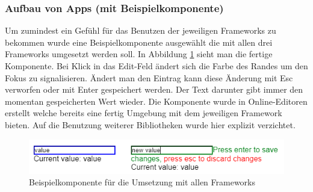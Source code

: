 \subsubsection{Aufbau von Apps (mit Beispielkomponente)}
Um zumindest ein Gefühl für das Benutzen der jeweiligen Frameworks zu bekommen wurde eine Beispielkomponente ausgewählt die mit allen drei Frameworks umgesetzt werden soll. In Abbildung \ref{fig:example_component} sieht man die fertige Komponente. Bei Klick in das Edit-Feld ändert sich die Farbe des Randes um den Fokus zu signalisieren. Ändert man den Eintrag kann diese Änderung mit Esc verworfen oder mit Enter gespeichert werden. Der Text darunter gibt immer den momentan gespeicherten Wert wieder. Die Komponente wurde in Online-Editoren erstellt welche bereits eine fertig Umgebung mit dem jeweiligen Framework bieten. Auf die Benutzung weiterer Bibliotheken wurde hier explizit verzichtet.

\begin{figure}
    \centering
    \captionsetup{justification=centering}
    \includegraphics{figures/example_component.png}
        \caption{Beispielkomponente für die Umsetzung mit allen Frameworks}
        \label{fig:example_component}
\end{figure}


